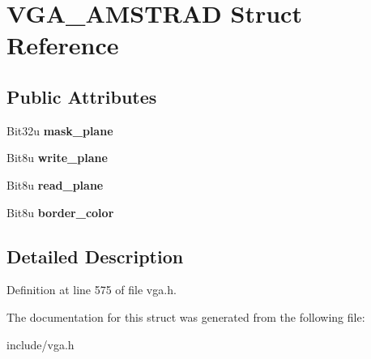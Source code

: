 \hypertarget{structVGA__AMSTRAD}{\section{V\-G\-A\-\_\-\-A\-M\-S\-T\-R\-A\-D Struct Reference}
\label{structVGA__AMSTRAD}
}
\subsection*{Public Attributes}
\begin{DoxyCompactItemize}
\item 
\hypertarget{structVGA__AMSTRAD_a3579c14ec7babb41e253a8310b9a71ed}{Bit32u {\bfseries mask\-\_\-plane}}\label{structVGA__AMSTRAD_a3579c14ec7babb41e253a8310b9a71ed}

\item 
\hypertarget{structVGA__AMSTRAD_a175865e5ad51119933b86b1a81f071dc}{Bit8u {\bfseries write\-\_\-plane}}\label{structVGA__AMSTRAD_a175865e5ad51119933b86b1a81f071dc}

\item 
\hypertarget{structVGA__AMSTRAD_adb93b9bfc436df9b90f1a7bc9d1dcfbe}{Bit8u {\bfseries read\-\_\-plane}}\label{structVGA__AMSTRAD_adb93b9bfc436df9b90f1a7bc9d1dcfbe}

\item 
\hypertarget{structVGA__AMSTRAD_ac7630605b97b058a383b751285e5de6e}{Bit8u {\bfseries border\-\_\-color}}\label{structVGA__AMSTRAD_ac7630605b97b058a383b751285e5de6e}

\end{DoxyCompactItemize}


\subsection{Detailed Description}


Definition at line 575 of file vga.\-h.



The documentation for this struct was generated from the following file\-:\begin{DoxyCompactItemize}
\item 
include/vga.\-h\end{DoxyCompactItemize}
